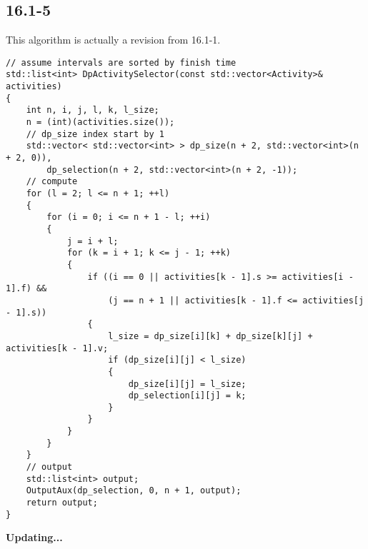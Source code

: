\subsection*{16.1-5}

This algorithm is actually a revision from 16.1-1.

\begin{verbatim}
// assume intervals are sorted by finish time
std::list<int> DpActivitySelector(const std::vector<Activity>& activities)
{
    int n, i, j, l, k, l_size;
    n = (int)(activities.size());
    // dp_size index start by 1
    std::vector< std::vector<int> > dp_size(n + 2, std::vector<int>(n + 2, 0)), 
        dp_selection(n + 2, std::vector<int>(n + 2, -1));
    // compute
    for (l = 2; l <= n + 1; ++l)
    {
        for (i = 0; i <= n + 1 - l; ++i)
        {
            j = i + l;
            for (k = i + 1; k <= j - 1; ++k)
            {
                if ((i == 0 || activities[k - 1].s >= activities[i - 1].f) && 
                    (j == n + 1 || activities[k - 1].f <= activities[j - 1].s))
                {
                    l_size = dp_size[i][k] + dp_size[k][j] + activities[k - 1].v;
                    if (dp_size[i][j] < l_size)
                    {
                        dp_size[i][j] = l_size;
                        dp_selection[i][j] = k;
                    }
                }
            }
        }
    }
    // output
    std::list<int> output;
    OutputAux(dp_selection, 0, n + 1, output);
    return output;
}
\end{verbatim}




\centerline{\textbf{Updating...}}

